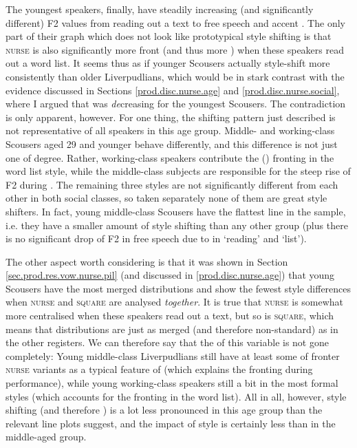 The youngest speakers, finally, have steadily increasing (and significantly different) F2 values from reading out a text to free speech and accent .
The only part of their graph which does not look like prototypical style shifting is that \textsc{nurse} is also significantly more front (and thus more ) when these speakers read out a word list.
It seems thus as if younger Scousers actually style-shift more consistently than older Liverpudlians, which would be in stark contrast with the evidence discussed in Sections \ref{prod.disc.nurse.age} and \ref{prod.disc.nurse.social}, where I argued that  was \emph{de}creasing for the youngest Scousers.
The contradiction is only apparent, however.
For one thing, the shifting pattern just described is not representative of all speakers in this age group.
Middle- and working-class Scousers aged 29 and younger behave differently, and this difference is not just one of degree.
Rather, working-class speakers contribute the () fronting in the word list style, while the middle-class subjects are responsible for the steep rise of F2 during .
The remaining three styles are not significantly different from each other in both social classes, so taken separately none of them are great style shifters.
In fact, young middle-class Scousers have the flattest line in the sample, i.e. they have a smaller amount of style shifting than any other group (plus there is no significant drop of F2 in free speech due to  in `reading' and `list').

The other aspect worth considering is that it was shown in Section \ref{sec.prod.res.vow.nurse.pil} (and discussed in \ref{prod.disc.nurse.age}) that young Scousers have the most merged distributions and show the fewest style differences when \textsc{nurse} and \textsc{square} are analysed \emph{together}.
It is true that \textsc{nurse} is somewhat more centralised when these speakers read out a text, but so is \textsc{square}, which means that  distributions are just as merged (and therefore non-standard) as in the other registers.
We can therefore say that the  of this variable is not gone completely:
Young middle-class Liverpudlians still have at least some  of fronter \textsc{nurse} variants as a typical feature of  (which explains the fronting during performance), while young working-class speakers still  a bit in the most formal styles (which accounts for the fronting in the word list).
All in all, however, style shifting (and therefore ) is a lot less pronounced in this age group than the relevant line plots suggest, and the impact of style is certainly less than in the middle-aged group.

